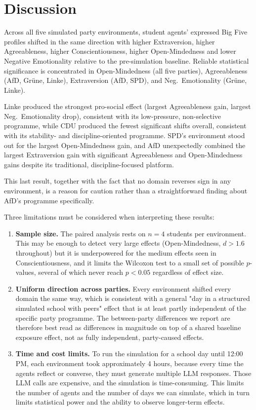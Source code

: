\chapter{Discussion}
\label{discussion}

Across all five simulated party environments, student agents' expressed Big Five profiles shifted in the same direction with higher Extraversion, higher Agreeableness, higher Conscientiousness, higher Open-Mindedness and lower Negative Emotionality relative to the pre-simulation baseline. Reliable statistical significance is concentrated in Open-Mindedness (all five parties), Agreeableness (AfD, Gr\"une, Linke), Extraversion (AfD, SPD), and Neg.\ Emotionality (Gr\"une, Linke). 

Linke produced the strongest pro-social effect (largest Agreeableness gain, largest Neg.\ Emotionality drop), consistent with its low-pressure, non-selective programme, while CDU produced the fewest significant shifts overall, consistent with its stability- and discipline-oriented programme. SPD's environment stood out for the largest Open-Mindedness gain, and AfD unexpectedly combined the largest Extraversion gain with significant Agreeableness and Open-Mindedness gains despite its traditional, discipline-focused platform.

This last result, together with the fact that no domain reverses sign in any environment, is a reason for caution rather than a straightforward finding about AfD's programme specifically. 

Three limitations must be considered when interpreting these results:

\begin{enumerate}
\item \textbf{Sample size.} The paired analysis rests on $n=4$ students per environment. This may be enough to detect very large effects (Open-Mindedness, $d>1.6$ throughout) but it is underpowered for the medium effects seen in Conscientiousness, and it limits the Wilcoxon test to a small set of possible $p$-values, several of which never reach $p<0.05$ regardless of effect size.
\item \textbf{Uniform direction across parties.} Every environment shifted every domain the same way, which is consistent with a general "day in a structured simulated school with peers" effect that is at least partly independent of the specific party programme. The between-party differences we report are therefore best read as differences in magnitude on top of a shared baseline exposure effect, not as fully independent, party-caused effects.
\item \textbf{Time and cost limits.} To run the simulation for a school day until 12:00 PM, each environment took approximately 4 hours, because every time the agents reflect or converse, they must generate multiple LLM responses. Those LLM calls are expensive, and the simulation is time-consuming. This limits the number of agents and the number of days we can simulate, which in turn limits statistical power and the ability to observe longer-term effects.
\end{enumerate}

